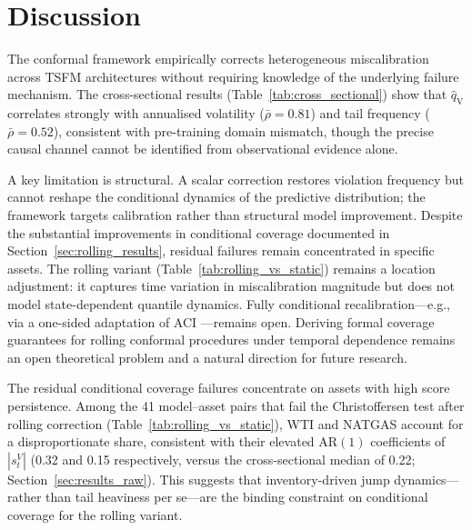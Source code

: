 \documentclass[preprint,11pt,authoryear]{elsarticle}
\newcommand{\1}{\boldsymbol{1}}
\newcommand{\qV}{\hat{q}_{\scriptscriptstyle\mathrm{V}}}
\begin{document}
	\section{Discussion}
	\label{sec:discuss}
	\label{sec:failure}

	The conformal framework empirically corrects heterogeneous miscalibration
	across TSFM architectures without requiring knowledge of the
	underlying failure mechanism. The cross-sectional results
	(Table~\ref{tab:cross_sectional}) show that $\qV$ correlates
	strongly with annualised volatility ($\bar\rho = 0.81$) and
	tail frequency ($\bar\rho = 0.52$), consistent with
	pre-training domain mismatch, though the precise causal
	channel cannot be identified from observational evidence alone.
	
	A key limitation is structural. A scalar correction restores
	violation frequency but cannot reshape the conditional
	dynamics of the predictive distribution; the framework targets calibration rather than structural model improvement. Despite the substantial improvements in conditional coverage documented in Section~\ref{sec:rolling_results}, residual failures remain concentrated in specific assets. The rolling variant
	(Table~\ref{tab:rolling_vs_static}) remains a location
	adjustment: it captures time variation in miscalibration magnitude but does not model state-dependent quantile dynamics. Fully conditional recalibration---e.g., via a
	one-sided adaptation of ACI \citep{gibbs2021adaptive}---remains
	open.
	Deriving formal coverage guarantees for rolling conformal procedures under temporal dependence remains an open theoretical problem and a natural direction for future research.

	The residual conditional coverage failures concentrate on assets
	with high score persistence. Among the 41 model--asset pairs that
	fail the Christoffersen test after rolling correction
	(Table~\ref{tab:rolling_vs_static}), WTI and NATGAS account for
	a disproportionate share, consistent with their elevated
	$\mathrm{AR}(1)$ coefficients of $|s^V_t|$ (0.32 and 0.15
	respectively, versus the cross-sectional median of 0.22;
	Section~\ref{sec:results_raw}). This suggests that
	inventory-driven jump dynamics---rather than tail heaviness per
	se---are the binding constraint on conditional coverage for the
	rolling variant.
\end{document}
